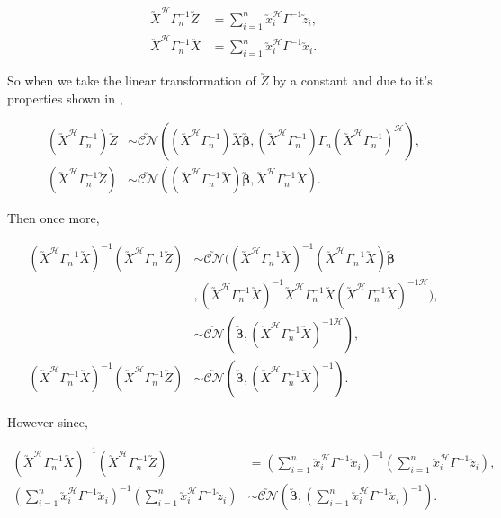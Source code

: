 \documentclass[honours,12pt]{unswthesis}
\newcommand{\ct}{\mathcal{H}}
\numberwithin{equation}{section}
\begin{document}
\begin{align*}
	\utilde{X}^{\ct} \Gamma_{n}^{-1} \utilde{Z} &= \sum_{i = 1}^{n} \utilde{x}_{i}^{\ct} \Gamma^{-1} \utilde{z}_{i},\\
	\utilde{X}^{\ct} \Gamma_{n}^{-1} \utilde{X} &= \sum_{i = 1}^{n} \utilde{x}_{i}^{\ct} \Gamma^{-1} \utilde{x}_{i}.
\end{align*}

\noindent So when we take the linear transformation of $\utilde{Z}$ by a constant and due to it's properties shown in \cite{ducharme2016},

\begin{align*}
	 \left( \utilde{X}^{\ct} \Gamma_{n}^{-1} \right) \utilde{Z} &\sim \utilde{\mathcal{CN}} \left(  \left( \utilde{X}^{\ct} \Gamma_{n}^{-1} \right) \utilde{X} \utilde{\bm{\beta}}, \left( \utilde{X}^{\ct} \Gamma_{n}^{-1} \right) \Gamma_{n} \left( \utilde{X}^{\ct} \Gamma_{n}^{-1} \right)^{\ct} \right),\\
	 \left( \utilde{X}^{\ct} \Gamma_{n}^{-1} \utilde{Z} \right) &\sim \utilde{\mathcal{CN}} \left( \left( \utilde{X}^{\ct} \Gamma_{n}^{-1} \utilde{X} \right) \utilde{\bm{\beta}}, \utilde{X}^{\ct} \Gamma_{n}^{-1} \utilde{X} \right).
\end{align*}

\noindent Then once more,

\begin{align*}
	\left( \utilde{X}^{\ct} \Gamma_{n}^{-1} \utilde{X} \right)^{-1} \left( \utilde{X}^{\ct} \Gamma_{n}^{-1} \utilde{Z} \right) &\sim \utilde{\mathcal{CN}} \Big( \left( \utilde{X}^{\ct} \Gamma_{n}^{-1} \utilde{X} \right)^{-1} \left( \utilde{X}^{\ct} \Gamma_{n}^{-1} \utilde{X} \right) \utilde{\bm{\beta}} \\
	&,\left( \utilde{X}^{\ct} \Gamma_{n}^{-1} \utilde{X} \right)^{-1} \utilde{X}^{\ct} \Gamma_{n}^{-1} \utilde{X} \left( \utilde{X}^{\ct} \Gamma_{n}^{-1} \utilde{X} \right)^{-1\ct}\Big),\\
	&\sim \utilde{\mathcal{CN}} \left( \utilde{\bm{\beta}}, \left( \utilde{X}^{\ct} \Gamma_{n}^{-1} \utilde{X} \right)^{-1\ct} \right),\\
	\left( \utilde{X}^{\ct} \Gamma_{n}^{-1} \utilde{X} \right)^{-1} \left( \utilde{X}^{\ct} \Gamma_{n}^{-1} \utilde{Z} \right) &\sim \utilde{\mathcal{CN}} \left( \utilde{\bm{\beta}}, \left( \utilde{X}^{\ct} \Gamma_{n}^{-1} \utilde{X} \right)^{-1} \right).
\end{align*}

\noindent However since,

\begin{align*}
	\left( \utilde{X}^{\ct} \Gamma_{n}^{-1} \utilde{X} \right)^{-1} \left( \utilde{X}^{\ct} \Gamma_{n}^{-1} \utilde{Z} \right) &= \left( \sum_{i = 1}^{n} \utilde{x}_{i}^{\ct} \Gamma^{-1} \utilde{x}_{i} \right)^{-1} \left( \sum_{i = 1}^{n} \utilde{x}_{i}^{\ct} \Gamma^{-1} \utilde{z}_{i} \right),\\
	\left( \sum_{i = 1}^{n} \utilde{x}_{i}^{\ct} \Gamma^{-1} \utilde{x}_{i} \right)^{-1} \left( \sum_{i = 1}^{n} \utilde{x}_{i}^{\ct} \Gamma^{-1} \utilde{z}_{i} \right) &\sim \utilde{\mathcal{CN}} \left( \utilde{\bm{\beta}}, \left( \sum_{i = 1}^{n} \utilde{x}_{i}^{\ct} \Gamma^{-1} \utilde{x}_{i} \right)^{-1} \right).
\end{align*}
\end{document}
